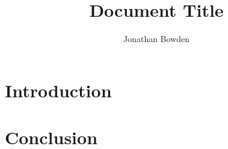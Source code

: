 \documentclass{article}
\title{Document Title}
\author{Jonathan Bowden}
\begin{document}
\maketitle

\section{Introduction}


\subsection{}


\subsection{}

\section{Conclusion}
\end{document}
